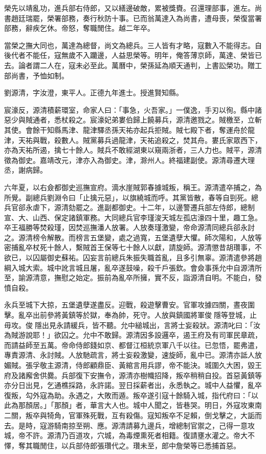 \begin{pinyinscope}
榮先以靖亂功，進兵部右侍郎，又以繕邊破敵，累被獎賚。召還理部事，進左。尚書趙廷瑞罷，榮署部務，奏行秋防十事。已而翁萬達入為尚書，遭母喪，榮復當署部務，辭疾乞休。帝怒，奪職閒住。越二年卒。

當榮之撫大同也，萬達為總督，尚文為總兵。三人皆有才略，寇數入不能得志。自後代者不能任，寇無歲不入躪邊，人益思榮等。明年，俺答薄京師，萬達、榮皆已去。論者謂二人在，寇未必至此。萬曆中，榮孫延為順天通判，上書訟榮功。贈工部尚書，予恤如制。

劉源清，字汝澄，東平人。正德九年進士。授進賢知縣。

宸濠反，源清積薪環室，命家人曰：「事急，火吾家。」一僕逸，手刃以徇。縣中諸惡少與賊通者，悉杖殺之。宸濠妃弟婁伯歸上饒募兵，源清邀戮之。賊檄至，立斬其使。會餘干知縣馬津、龍津驛丞孫天祐亦起兵拒賊。賊七殿下者，奪運舟於龍津，天祐與戰，殺數人。賊黨募兵過龍津，天祐追殺之，焚其舟。婁氏家眾西下，亦為天祐所遏，擒七十餘人。賊兵不敢經湖東以窺兩浙者，三人力也。賊平，源清徵為御史。嘉靖改元，津亦入為御史。津，滁州人。終福建副使。源清尋遷大理丞，謝病歸。

六年夏，以右僉都御史巡撫宣府。滴水崖賊郭春據城叛，稱王。源清遣卒捕之，為所覺。副總兵劉淵令曰「止擒元惡」，以旗繞城而呼。其黨皆散，春等自剄死。總兵官郤永虐下，源清劾罷之。進副都御史。十二年，以邊警遷兵部左侍郎，總制宣、大、山西、保定諸鎮軍務。大同總兵官李瑾浚天城左孤店濠四十里，趣工急。卒王福勝等焚殺瑾，因焚巡撫潘人放署。人放奏瑾激變，帝命源清同總兵郤永討之。源清榜令解散。而榜言五堡變，處之過寬，五堡遺孽大懼。師次陽和，人放等密捕亂卒杖死十餘人，繫賊首王保等七十餘人以獻，請旋師。源清懲昔胡瓚事，不欲已，以囚屬御史蘇祐。囚妄言前總兵朱振失職首亂，且多引無辜。源清遣參將趙綱入城大索。城中訛言城且屠，亂卒遂鼓噪，殺千戶張欽。會僉事孫允中自源清所至，諭源清意，撫慰之始定。振前為亂卒所擁，實不反，詣源清自明。不能白，發憤自殺。

永兵至城下大掠，五堡遺孽遂盡反。迎戰，殺遊擊曹安。官軍攻據四關，晝夜圍擊。亂卒出前參將黃鎮等於獄，奉為帥，死守。人放與鎮國將軍俊隱等登城，止毋攻。俊隱出見永請緩兵，皆不聽。允中縋城出，言將士妄殺狀。源清叱曰：「汝為賊游說耶！」欲囚之。允中不敢歸。源清因多設邏卒，遏王府及有司軍民章疏，而請益師至五萬。帝命侍郎錢如京、都督江桓統京軍八千以往。已忽悟，罷弗遣，專責源清、永討賊。人放馳疏言，將士妄殺激變，速旋師，亂中已。源清亦詆人放媚賊。張孚敬主源清，侍郎顧鼎臣、黃綰言用兵謬，帝不能決。城圍久大困，毀王府及諸廨舍供爨。兵部復下安撫令，源清亦樹幟招降，叛卒稍稍自投。首惡黃鎮等亦分日出見，乞通樵採路，永許諾。翌日採薪者出，永悉執之。城中人益懼，亂卒復叛，勾外寇為助。永遇之，大敗而遁。叛卒遂引寇十餘騎入城，指代府曰：「以此為那顏居。」「那顏」者，華言大人也。城中人聞之，皆巷哭。明日，外寇攻東南二關，叛卒與犄角，官軍殊死戰，互有殺傷。寇知叛卒不足賴，倒戈擊之，大詬而去。是時，寇游騎南掠至朔、應。源清請募九邊兵，增總制官禦之，己得一意攻城，帝不許。源清乃百道攻，穴城，為毒煙熏死者相籍。復請壅水灌之。帝大不懌，奪其職閒住，以兵部侍郎張瓚代之。瓚未至，郎中詹榮等已悉捕首惡。


\end{pinyinscope}
